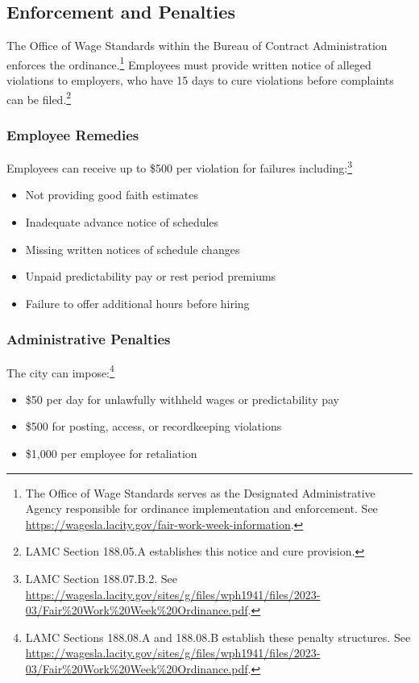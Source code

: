 \documentclass[letterpaper,11pt,leqno]{article}
\theoremstyle{paper}
\begin{document}
\subsection{Enforcement and Penalties}

The Office of Wage Standards within the Bureau of Contract Administration enforces the ordinance.\footnote{The Office of Wage Standards serves as the Designated Administrative Agency responsible for ordinance implementation and enforcement. See \url{https://wagesla.lacity.gov/fair-work-week-information}.} Employees must provide written notice of alleged violations to employers, who have 15 days to cure violations before complaints can be filed.\footnote{LAMC Section 188.05.A establishes this notice and cure provision.}

\subsubsection{Employee Remedies}
Employees can receive up to \$500 per violation for failures including:\footnote{LAMC Section 188.07.B.2. See \url{https://wagesla.lacity.gov/sites/g/files/wph1941/files/2023-03/Fair\%20Work\%20Week\%20Ordinance.pdf}.}
\begin{itemize}
   \item Not providing good faith estimates
   \item Inadequate advance notice of schedules
   \item Missing written notices of schedule changes
   \item Unpaid predictability pay or rest period premiums
   \item Failure to offer additional hours before hiring
\end{itemize}

\subsubsection{Administrative Penalties}
The city can impose:\footnote{LAMC Sections 188.08.A and 188.08.B establish these penalty structures. See \url{https://wagesla.lacity.gov/sites/g/files/wph1941/files/2023-03/Fair\%20Work\%20Week\%20Ordinance.pdf}.}
\begin{itemize}
   \item \$50 per day for unlawfully withheld wages or predictability pay
   \item \$500 for posting, access, or recordkeeping violations
   \item \$1,000 per employee for retaliation
\end{itemize}
\end{document}
